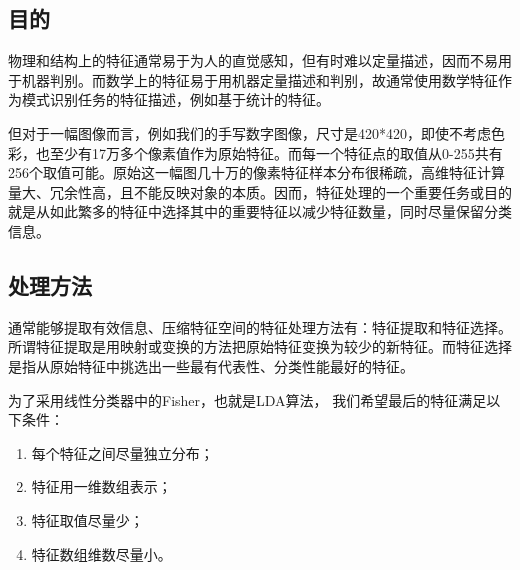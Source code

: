 \documentclass[UTF8, a4paper, 12pt]{report}
\begin{document}
		\subsection{目的}
			物理和结构上的特征通常易于为人的直觉感知，但有时难以定量描述，因而不易用于机器判别。而数学上的特征易于用机器定量描述和判别，故通常使用数学特征作为模式识别任务的特征描述，例如基于统计的特征。

			但对于一幅图像而言，例如我们的手写数字图像，尺寸是420*420，即使不考虑色彩，也至少有17万多个像素值作为原始特征。而每一个特征点的取值从0-255共有256个取值可能。原始这一幅图几十万的像素特征样本分布很稀疏，高维特征计算量大、冗余性高，且不能反映对象的本质。因而，特征处理的一个重要任务或目的就是从如此繁多的特征中选择其中的重要特征以减少特征数量，同时尽量保留分类信息。

		\subsection{处理方法}
			通常能够提取有效信息、压缩特征空间的特征处理方法有：特征提取和特征选择。所谓特征提取是用映射或变换的方法把原始特征变换为较少的新特征。而特征选择是指从原始特征中挑选出一些最有代表性、分类性能最好的特征。
		
			为了采用线性分类器中的Fisher，也就是LDA算法， 我们希望最后的特征满足以下条件：
			\begin{enumerate}[itemindent=1em]
				\renewcommand{\labelenumi}{\theenumi)}
				\item 每个特征之间尽量独立分布；
				\item 特征用一维数组表示；
				\item 特征取值尽量少；
				\item 特征数组维数尽量小。
			\end{enumerate}
\end{document}
